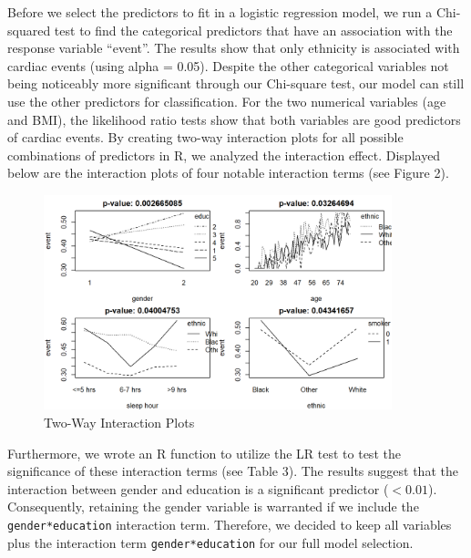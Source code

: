 \documentclass[12pt]{article}
\begin{document}
Before we select the predictors to fit in a logistic regression model, we run a Chi-squared test to find the categorical predictors that have an association with the response variable “event”. The results show that only ethnicity is associated with cardiac events (using alpha = 0.05). Despite the other categorical variables not being noticeably more significant through our Chi-square test, our model can still use the other predictors for classification. For the two numerical variables (age and BMI), the likelihood ratio tests show that both variables are good predictors of cardiac events. By creating two-way interaction plots for all possible combinations of predictors in R, we analyzed the interaction effect. Displayed below are the interaction plots of four notable interaction terms (see Figure 2).\\
\begin{figure}[!h]
\centering
\includegraphics[width=0.9\textwidth]{Img/top4 interaction.png}
\caption{Two-Way Interaction Plots}
\end{figure}

Furthermore, we wrote an R function to utilize the LR test to test the significance of these interaction terms (see Table 3). The results suggest that the interaction between gender and education is a significant predictor ($<0.01$). Consequently, retaining the gender variable is warranted if we include the \verb|gender*education| interaction term. Therefore, we decided to keep all variables plus the interaction term \verb|gender*education| for our full model selection.
\end{document}
